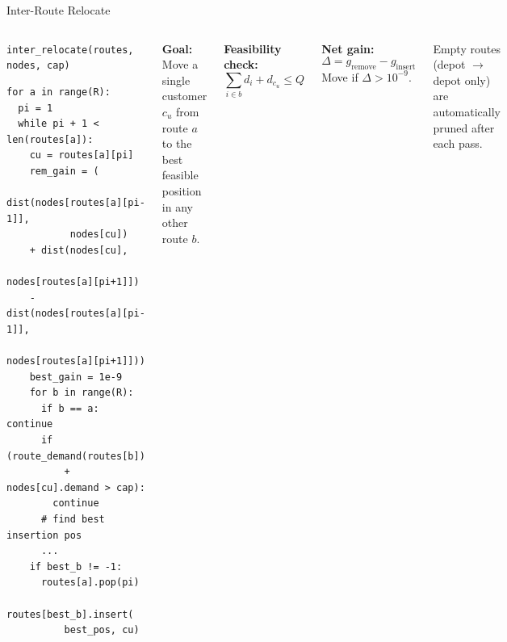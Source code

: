 \documentclass{beamer}
\begin{document}
\begin{frame}[fragile]{Inter-Route Relocate}

\begin{columns}[T]

\begin{block}{\texttt{inter\_relocate(routes, nodes, cap)}}
\begin{lstlisting}
for a in range(R):
  pi = 1
  while pi + 1 < len(routes[a]):
    cu = routes[a][pi]
    rem_gain = (
      dist(nodes[routes[a][pi-1]],
           nodes[cu])
    + dist(nodes[cu],
           nodes[routes[a][pi+1]])
    - dist(nodes[routes[a][pi-1]],
           nodes[routes[a][pi+1]]))
    best_gain = 1e-9
    for b in range(R):
      if b == a: continue
      if (route_demand(routes[b])
          + nodes[cu].demand > cap):
        continue
      # find best insertion pos
      ...
    if best_b != -1:
      routes[a].pop(pi)
      routes[best_b].insert(
          best_pos, cu)
\end{lstlisting}
\end{block}

\small
\textbf{Goal:} Move a single customer $c_u$ from route $a$ to the best feasible position in any other route $b$.

\vspace{0.3em}
\textbf{Feasibility check:}
\[
  \sum_{i \in b} d_i + d_{c_u} \leq Q
\]

\vspace{0.3em}
\textbf{Net gain:}
\[
  \Delta = g_{\text{remove}} - g_{\text{insert}}
\]
Move if $\Delta > 10^{-9}$.

\vspace{0.3em}
\footnotesize Empty routes (depot $\to$ depot only) are automatically pruned after each pass.
\end{columns}

\end{frame}
\end{document}
